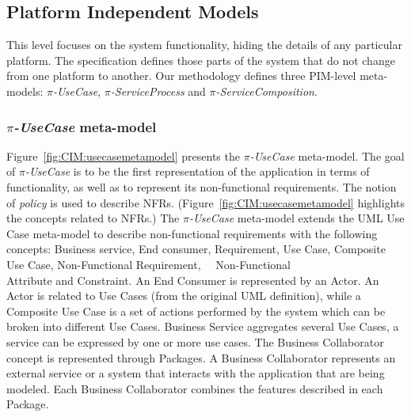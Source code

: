 \subsection{Platform Independent Models}

This level focuses on the system functionality, hiding the details of any particular platform.
The specification defines those parts of the system that do not change from one platform to another. 
Our methodology defines three PIM-level meta-models: \textit{$\pi$-UseCase}, \textit{$\pi$-Ser\-vice\-Pro\-cess} and \textit{$\pi$-ServiceComposition}.
 
\subsubsection{\textit{$\pi$-UseCase} meta-model}%

Figure~\ref{fig:CIM:usecasemetamodel} presents the \textit{$\pi$-UseCase} meta-model.
The goal of \textit{$\pi$-UseCase}  is to be the first representation of the application in terms of functionality, as well as to represent its non-func\-tion\-al requirements.
The notion of \textit{policy} is used to describe NFRs. 
(Figure~\ref{fig:CIM:usecasemetamodel} highlights the concepts related to NFRs.)
The \textit{$\pi$-UseCase} meta-model extends the UML Use Case meta-model to describe non-functional requirements with  the following  concepts:  {\sc Business service}, {\sc End consumer}, {\sc Requirement}, {\sc Use Case}, {\sc Composite Use Case}, {\sc Non-\-Func\-tion\-al Requirement}, \ \ {\sc Non-Functional}\\ {\sc At\-tri\-bute} and {\sc Constraint}. 
An {\sc End Consumer} is represented by an {\sc Actor}. 
An  {\sc Actor} is related to {\sc Use Cases} (from the original UML definition), while a {\sc  Composite Use Case} is a set of actions performed by the system which can be broken into different {\sc Use Cases}.
{\sc  Business Service} aggregates several {\sc Use Cases},  a service can be expressed by one or more use cases.
 The {\sc Business Collaborator} concept is represented  through {\sc Packages}. 
A {\sc Business Collaborator} represents an external service or a system that interacts with the application that are being modeled. 
Each {\sc Business Collaborator} combines the features described in each  {\sc Package}. 
 
